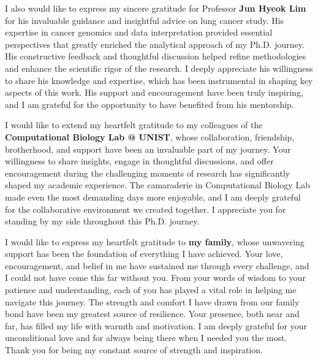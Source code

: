 \documentclass[11pt, a4paper, onecolumn, oneside]{report}
\begin{document}
        I also would like to express my sincere gratitude for Professor \textbf{Jun Hyeok Lim} for his invaluable guidance and insightful advice on lung cancer study. His expertise in cancer genomics and data interpretation provided essential perspectives that greatly enriched the analytical approach of my Ph.D. journey. His constructive feedback and thoughtful discussion helped refine methodologies and enhance the scientific rigor of the research. I deeply appreciate his willingness to share his knowledge and expertise, which has been instrumental in shaping key aspects of this work. His support and encouragement have been truly inspiring, and I am grateful for the opportunity to have benefited from his mentorship.

        I would like to extend my heartfelt gratitude to my colleagues of the \textbf{Computational Biology Lab @ UNIST}, whose collaboration, friendship, brotherhood, and support have been an invaluable part of my journey. Your willingness to share insights, engage in thoughtful discussions, and offer encouragement during the challenging moments of research has significantly shaped my academic experience. The camaraderie in Computational Biology Lab made even the most demanding days more enjoyable, and I am deeply grateful for the collaborative environment we created together. I appreciate you for standing by my side throughout this Ph.D. journey.

        I would like to express my heartfelt gratitude to \textbf{my family}, whose unwavering support has been the foundation of everything I have achieved. Your love, encouragement, and belief in me have sustained me through every challenge, and I could not have come this far without you. From your words of wisdom to your patience and understanding, each of you has played a vital role in helping me navigate this journey. The strength and comfort I have drawn from our family bond have been my greatest source of resilience. Your presence, both near and far, has filled my life with warmth and motivation. I am deeply grateful for your unconditional love and for always being there when I needed you the most. Thank you for being my constant source of strength and inspiration.
\end{document}

